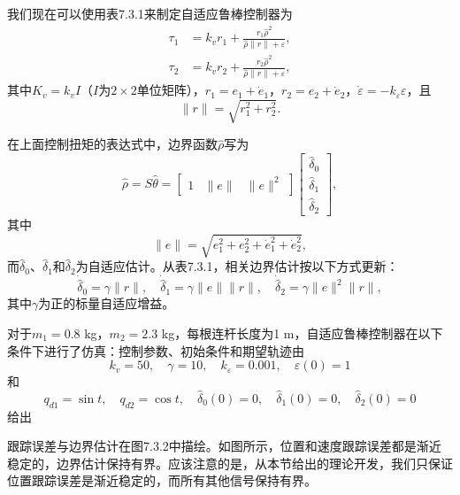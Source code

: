 \documentclass[UTF8]{ctexart}
\begin{document}
我们现在可以使用表7.3.1来制定自适应鲁棒控制器为
\begin{align}
\tau_1 &= k_v r_1 + \frac{r_1\hat{\rho}^2}{\hat{\rho}\|r\| + \varepsilon}, \\
\tau_2 &= k_v r_2 + \frac{r_2\hat{\rho}^2}{\hat{\rho}\|r\| + \varepsilon},
\end{align}
其中$K_v = k_v I$（$I$为$2\times 2$单位矩阵），$r_1 = e_1 + \dot{e}_1$，$r_2 = e_2 + \dot{e}_2$，$\dot{\varepsilon} = -k_\varepsilon\varepsilon$，且
\begin{equation}
\|r\| = \sqrt{r_1^2 + r_2^2}.
\end{equation}

在上面控制扭矩的表达式中，边界函数$\hat{\rho}$写为
\begin{equation}
\hat{\rho} = S\hat{\theta}
= \begin{bmatrix} 1 & \|e\| & \|e\|^2 \end{bmatrix}
\begin{bmatrix} \hat{\delta}_0 \\ \hat{\delta}_1 \\ \hat{\delta}_2 \end{bmatrix},
\end{equation}
其中
\begin{equation}
\|e\| = \sqrt{e_1^2 + e_2^2 + \dot{e}_1^2 + \dot{e}_2^2},
\end{equation}
而$\hat{\delta}_0$、$\hat{\delta}_1$和$\hat{\delta}_2$为自适应估计。从表7.3.1，相关边界估计按以下方式更新：
\begin{equation}
\dot{\hat{\delta}}_0 = \gamma\|r\|, \quad \dot{\hat{\delta}}_1 = \gamma\|e\|\|r\|, \quad \dot{\hat{\delta}}_2 = \gamma\|e\|^2\|r\|,
\end{equation}
其中$\gamma$为正的标量自适应增益。

对于$m_1=0.8$ kg，$m_2=2.3$ kg，每根连杆长度为1 m，自适应鲁棒控制器在以下条件下进行了仿真：控制参数、初始条件和期望轨迹由
\begin{equation*}
k_v = 50, \quad \gamma = 10, \quad k_\varepsilon = 0.001, \quad \varepsilon(0) = 1
\end{equation*}
和
\begin{equation*}
q_{d1} = \sin t, \quad q_{d2} = \cos t, \quad \hat{\delta}_0(0) = 0, \quad \hat{\delta}_1(0) = 0, \quad \hat{\delta}_2(0) = 0
\end{equation*}
给出

跟踪误差与边界估计在图7.3.2中描绘。如图所示，位置和速度跟踪误差都是渐近稳定的，边界估计保持有界。应该注意的是，从本节给出的理论开发，我们只保证位置跟踪误差是渐近稳定的，而所有其他信号保持有界。
\end{document}
